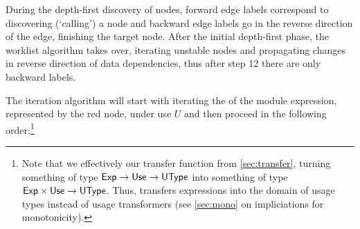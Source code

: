 \begin{example}
  During the depth-first discovery of nodes, forward edge labels correspond to discovering (`calling') a node and backward edge labels go in the reverse direction of the edge, \eg finishing the target node.
  After the initial depth-first phase, the worklist algorithm takes over, iterating unstable nodes and propagating changes in reverse direction of data dependencies, thus after step 12 there are only backward labels.

  The iteration algorithm will start with iterating the  of the module expression, represented by the red node, under use $U$ and then proceed in the following order:\footnote{Note that we effectively  our transfer function from \cref{sec:transfer}, turning something of type $\text{\textsf{Exp}} \to \text{\textsf{Use}} \to \text{\textsf{UType}}$ into something of type $\text{\textsf{Exp}} \times \text{\textsf{Use}} \to \text{\textsf{UType}}$. Thus,  transfers expressions into the domain of usage types instead of usage transformers (see \cref{sec:mono} on impliciations for monotonicity).}


\end{example}
